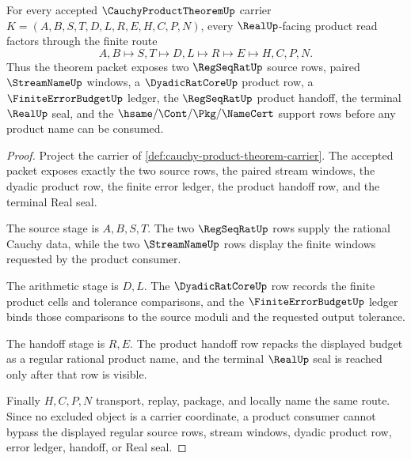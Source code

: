 \begin{theorem}
\label{thm:cauchy-product-theorem-finite-route}
For every accepted $\CauchyProductTheoremUp$ carrier $K=(A,B,S,T,D,L,R,E,H,C,P,N)$, every $\RealUp$-facing product read factors through the finite route
$$
A,B \longmapsto S,T \longmapsto D,L \longmapsto R \longmapsto E \longmapsto H,C,P,N .
$$
Thus the theorem packet exposes two $\RegSeqRatUp$ source rows, paired $\StreamNameUp$ windows, a $\DyadicRatCoreUp$ product row, a $\FiniteErrorBudgetUp$ ledger, the $\RegSeqRatUp$ product handoff, the terminal $\RealUp$ seal, and the $\hsame/\Cont/\Pkg/\NameCert$ support rows before any product name can be consumed.
\end{theorem}
\begin{proof}
Project the carrier of \autoref{def:cauchy-product-theorem-carrier}. The accepted packet exposes exactly the two source rows, the paired stream windows, the dyadic product row, the finite error ledger, the product handoff row, and the terminal Real seal.

The source stage is $A,B,S,T$. The two $\RegSeqRatUp$ rows supply the rational Cauchy data, while the two $\StreamNameUp$ rows display the finite windows requested by the product consumer.

The arithmetic stage is $D,L$. The $\DyadicRatCoreUp$ row records the finite product cells and tolerance comparisons, and the $\FiniteErrorBudgetUp$ ledger binds those comparisons to the source moduli and the requested output tolerance.

The handoff stage is $R,E$. The product handoff row repacks the displayed budget as a regular rational product name, and the terminal $\RealUp$ seal is reached only after that row is visible.

Finally $H,C,P,N$ transport, replay, package, and locally name the same route. Since no excluded object is a carrier coordinate, a product consumer cannot bypass the displayed regular source rows, stream windows, dyadic product row, error ledger, handoff, or Real seal.
\end{proof}

